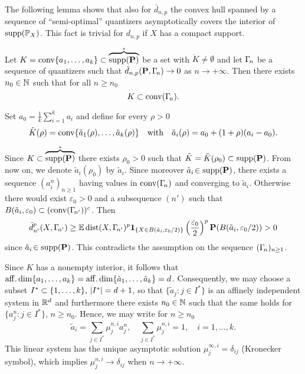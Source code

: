 The following lemma shows that also for $\bar d_{n,p}$ the convex hull 
spanned by a sequence of ``semi-optimal'' quantizers asymptotically covers the
interior of $\operatorname{supp}(\mathbb{P}_X)$. This fact is trivial for $d_{n,p}$ if $X$ has  a compact
support.  

\begin{lemma}\label{lem:radius} Let $K  = \operatorname{conv}\{a_1, \ldots, a_k\} \subset  \mathring{\overbrace{\operatorname{supp}(\mathbf{P})}}$ be a set with $\mathring
K \neq \emptyset$ and let $\Gamma_{\!n}$ be a sequence of quantizers such that $\bar
d_{n,p}(\mathbf{P},\Gamma_{\!n})\to 0$ as $n\to +\infty$. Then there exists $n_0\in\mathbb{N}$ such that for all $n\geq n_0$
\[
K \subset \operatorname{conv}(\Gamma_{\!n}).
\]
\end{lemma}

 Set $a_0 = \frac{1}{k} \sum_{i=1}^k a_i$ and define for every $\rho > 0$
\[
\tilde K(\rho) = \operatorname{conv}\{\tilde a_1(\rho), \ldots, \tilde a_k(\rho)\}
\quad \text{with}\quad
\tilde a_i(\rho)= a_0 + (1+\rho) (a_i - a_0).
\]

Since $K\subset\mathring{\overbrace{\operatorname{supp}(\mathbf{P})}}$ there exists  $\rho_0 > 0$ such that $\tilde K =
\tilde K(\rho_0) \subset \operatorname{supp}(\mathbf{P})$. From now on, we denote $\tilde
a_i(\rho_0)$ by $\tilde a_i$.
Since moreover $\tilde a_i \!\in \operatorname{supp}(\mathbf{P})$, there exists a sequence
$(a^{n}_i)_{n\ge 1}$ having values in $\operatorname{conv}(\Gamma_{\!n})$ and converging to
$\tilde a_i$. Otherwise there would exist $\varepsilon_0>0$ and a subsequence
$(n')$ such that $B(\tilde a_i,\varepsilon_0)\subset (\operatorname{conv}(\Gamma_{\!n'}))^c$.
Then 
$$
\bar d_{n'}^p(X,\Gamma_{\!n'}) \ge \mathbb{E}\, {\rm dist}(X,\Gamma_{\!n'})^p\mbox{\bf 1}_{\{X\in B(\tilde a_i,\varepsilon_0/2)\}}
\left(\frac{\varepsilon_0}{2}\right)^p \mathbf{P}(B(\tilde a_i,\varepsilon_0/2))>0
$$
since $\tilde a_i\!\in {\rm supp}(\mathbf{P})$. This contradicts the assumption on the sequence
$(\Gamma_{\!n})_{n\ge 1}$.  

Since $K$ has a nonempty interior, it follows that $\operatorname{aff.dim}
\{a_1, \ldots, a_k\} = \operatorname{aff.dim} \{\tilde a_1, \ldots, \tilde a_k\} = d$. Consequently,
we may choose a subset $I^\ast \subset\{1, \ldots, k\}, \,\lvert I^\ast\rvert = d+1$, so
that $\{\tilde a_j: j\in I^\ast\}$ is an affinely independent system in $\mathbb{R}^d$
and furthermore there exists  $n_0 \in \mathbb{N}$ such that the same holds for
$\{a^n_j: j\in I^\ast\}$, $n \geq n_0$.
Hence, we may write for $n\geq n_0$
\begin{equation}\label{eq:lemmaoneproofLS}
 \tilde a_i= \sum_{j\in I^\ast} \mu^{n,i}_ja^n_j,\quad
 \sum_{j\in I^\ast}\mu^{n,i}_j=1,\quad i=1,\ldots,k. 
 \end{equation}
 This linear system has the unique asymptotic solution $\mu^{\infty,i}_j =
 \delta_{ij}$ (Kronecker symbol), which implies $\mu^{n,i}_j\to \delta_{ij}$
when  $n\to+\infty$.

